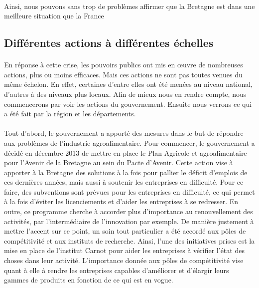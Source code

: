 \documentclass[a4paper,12pt]{report}
\begin{document}
			\paragraph{}Ainsi, nous pouvons sans trop de problèmes affirmer que la Bretagne est dans une meilleure situation que la France
			
		\subsection{Différentes actions à différentes échelles}
			\paragraph{}En réponse à cette crise, les pouvoirs publics ont mis en œuvre de nombreuses actions, plus ou moins efficaces. Mais ces actions ne sont pas toutes venues du même échelon. En effet, certaines d'entre elles ont été menées au niveau national, d'autres à des niveaux plus locaux. Afin de mieux nous en rendre compte, nous commencerons par voir les actions du gouvernement. Ensuite nous verrons ce qui a été fait par la région et les départements.

			\paragraph{}Tout d’abord, le gouvernement a apporté des mesures dans le but de répondre aux problèmes de l’industrie agroalimentaire. Pour commencer, le gouvernement a décidé en décembre 2013 de mettre en place le Plan Agricole et agroalimentaire pour l’Avenir de la Bretagne au sein du Pacte d’Avenir\cite{PacteAvenirBretagne}. Cette action vise à apporter à la Bretagne des solutions à la fois pour pallier le déficit d’emplois de ces dernières années, mais aussi à soutenir les entreprises en difficulté. Pour ce faire, des subventions sont prévues pour les entreprises en difficulté, ce qui permet à la fois d’éviter les licenciements et d’aider les entreprises à se redresser. En outre, ce programme cherche à accorder plus d’importance au renouvellement des activités, par l’intermédiaire de l’innovation par exemple. De manière justement à mettre l’accent sur ce point, un soin tout particulier a été accordé aux pôles de compétitivité et aux instituts de recherche. Ainsi, l'une des initiatives prises est la mise en place de l’institut Carnot pour aider les entreprises à vérifier l’état des choses dans leur activité. L’importance donnée aux pôles de compétitivité vise quant à elle à rendre les entreprises capables d’améliorer et d’élargir leurs gammes de produits en fonction de ce qui est en vogue.
\end{document}
